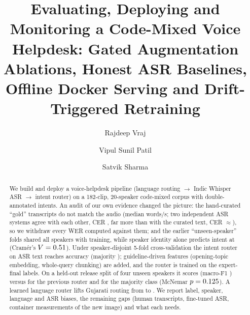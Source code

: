 \documentclass[sigconf,authordraft]{acmart}
\begin{document}
\title[Project 5 -- Assignment 2: Voice Helpdesk ASR]{%
  Evaluating, Deploying and Monitoring a Code-Mixed Voice Helpdesk:
  Gated Augmentation Ablations, Honest ASR Baselines, Offline Docker Serving and Drift-Triggered Retraining}

\author{Rajdeep Vraj}
\author{Vipul Sunil Patil}
\authornotemark[1]
\author{Satvik Sharma}
\authornotemark[1]
\renewcommand{\shortauthors}{Vraj, Patil and Sharma}

\begin{abstract}
We build and deploy a voice-helpdesk pipeline (language routing $\to$ Indic Whisper ASR $\to$ intent router) on a 182-clip, 20-speaker code-mixed corpus with double-annotated intents.
An audit of our own evidence changed the picture: the hand-curated ``gold'' transcripts do not match the audio (median \RefWps{} words/s; two independent ASR systems agree with each other, CER \RefCerXasr{}, far more than with the curated text, CER $\approx$\RefCerCur{}), so we withdraw every WER computed against them; and the earlier ``unseen-speaker'' folds shared all speakers with training, while speaker identity alone predicts intent at \SpkShortcut{} (Cram\'er's $V=0.51{}$).
Under speaker-disjoint 5-fold cross-validation the intent router on ASR text reaches \SpkBase{} accuracy (majority \SpkMaj{}); guideline-driven features (opening-topic embedding, whole-query chunking) are added, and the router is trained on the expert-final labels. On a held-out release split of four unseen speakers it scores \RelVtwo{} (macro-F1 \RelVtwoFone{}) versus \RelVone{} for the previous router and \RelMaj{} for the majority class (McNemar $p=0.125{}$).
A learned language router lifts Gujarati routing from \LidGuBase{} to \LidGuLearned{}. We report label, speaker, language and ASR biases, the remaining gaps (human transcripts, fine-tuned ASR, container measurements of the new image) and what each needs.
\end{abstract}
\end{document}

